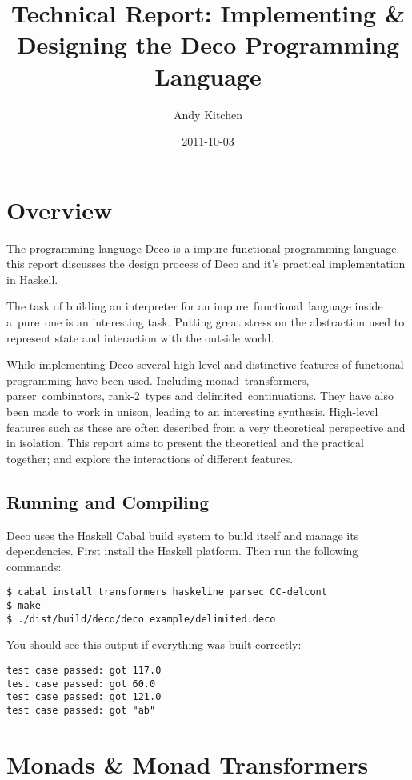 \documentclass[]{article}
\title{Technical Report: Implementing \& Designing the Deco Programming Language}
\author{Andy Kitchen}
\date{2011-10-03}
\begin{document}
\maketitle

\section{Overview}

The programming language Deco is a impure functional programming language.
this report discusses the design process of Deco and it's practical
implementation in Haskell.

The task of building an interpreter for an impure~functional~language inside
a~pure~one is an interesting task. Putting great stress on the abstraction
used to represent state and interaction with the outside world.

While implementing Deco several high-level and distinctive features of
functional programming have been used. Including monad~transformers,
parser~combinators, rank-2~types and delimited~continuations. They have also
been made to work in unison, leading to an interesting synthesis. High-level
features such as these are often described from a very theoretical perspective
and in isolation. This report aims to present the theoretical and the
practical together; and explore the interactions of different features.

\subsection{Running and Compiling}

Deco uses the Haskell Cabal build system to build itself and manage its
dependencies. First install the Haskell platform. Then run the following
commands:

\lstset{language=bash}
\begin{verbatim}
$ cabal install transformers haskeline parsec CC-delcont
$ make
$ ./dist/build/deco/deco example/delimited.deco 
\end{verbatim}

You should see this output if everything was built correctly:

\begin{verbatim}
test case passed: got 117.0
test case passed: got 60.0
test case passed: got 121.0
test case passed: got "ab"
\end{verbatim}

\section{Monads \& Monad Transformers}
\end{document}
